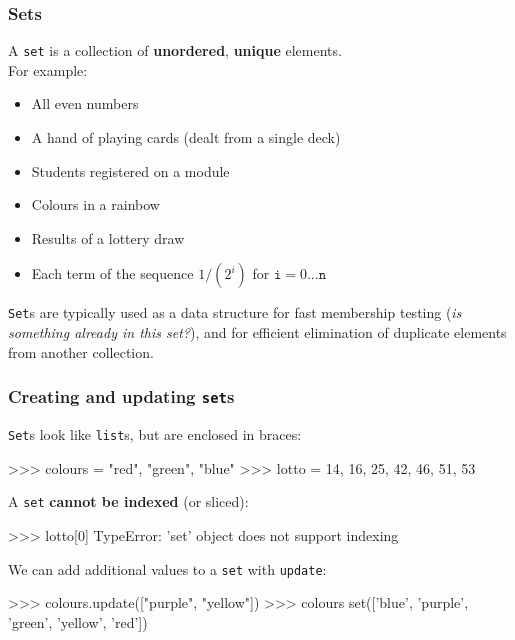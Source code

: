 \documentclass{beamer}
\begin{document}
\begin{frame}[fragile]
\frametitle{Sets}
    A \texttt{set} is a collection of \textbf{unordered}, \textbf{unique} elements.\\
    For example:

    \begin{itemize}
        \item All even numbers
        \item A hand of playing cards (dealt from a single deck)
        \item Students registered on a module
        \item Colours in a rainbow
        \item Results of a lottery draw
        \item Each term of the sequence $1/(2^i)$ for $\texttt{i}=0...\texttt{n}$
    \end{itemize}

    \texttt{Set}s are typically used as a data structure for fast 
    membership testing (\textit{is something already in this set?}), and for
    efficient elimination of duplicate elements from another collection.
\end{frame}


\begin{frame}[fragile]
\frametitle{Creating and updating \texttt{set}s}
\texttt{Set}s look like \texttt{list}s, but are enclosed in braces:
\begin{code}
>>> colours = {"red", "green", "blue"}
>>> lotto = {14, 16, 25, 42, 46, 51, 53}
\end{code}

\vskip 0.2cm
A \texttt{set} \textbf{cannot be indexed} (or sliced):
\begin{code}
>>> lotto[0]
TypeError: 'set' object does not support indexing
\end{code}

\vskip 0.2cm
We can add additional values to a \texttt{set} with \texttt{update}:
\begin{code}
>>> colours.update(["purple", "yellow"])
>>> colours
set(['blue', 'purple', 'green', 'yellow', 'red'])
\end{code}
\end{frame}
\end{document}

